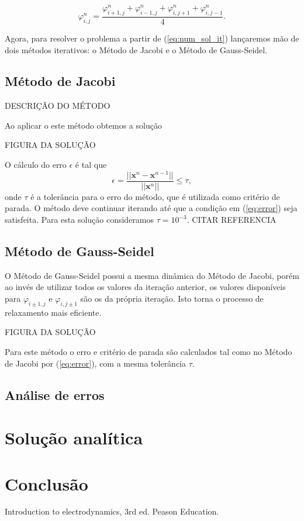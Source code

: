 \documentclass[a4paper,12pt]{article}
\begin{document}
\begin{equation}
  \varphi_{i,j}^n = \frac{\varphi_{i+1,j}^{n}+\varphi_{i-1,j}^{n}+\varphi_{i,j+1}^{n}+\varphi_{i,j-1}^{n}}{4}.
  \label{eq:num_sol_it}
\end{equation}

Agora, para resolver o problema a partir de (\ref{eq:num_sol_it}) lançaremos mão de dois métodos iterativos: o Método de Jacobi e o Método de Gauss-Seidel.

\subsection*{Método de Jacobi}

DESCRIÇÃO DO MÉTODO

Ao aplicar o este método obtemos a solução

FIGURA DA SOLUÇÃO

O cálculo do erro $\epsilon$ é tal que
\begin{equation}
  \epsilon = \frac{||\mathbf{x}^n-\mathbf{x}^{n-1}||}{||\mathbf{x}^n||} \leq \tau,
  \label{eq:error}
\end{equation}
onde $\tau$ é a tolerância para o erro do método, que é utilizada como critério de parada. O método deve continuar iterando até que a condição em (\ref{eq:error}) seja satisfeita. Para esta solução consideramos $\tau = 10^{-3}$. CITAR REFERENCIA


\subsection*{Método de Gauss-Seidel}

O Método de Gauss-Seidel possui a mesma dinâmica do Método de Jacobi, porém ao invés de utilizar todos os valores da
iteração anterior, os valores disponíveis para $\varphi_{i\pm1, j}$ e $\varphi_{i,j\pm 1}$ são os da própria iteração. Isto torna o processo de relaxamento mais eficiente.

FIGURA DA SOLUÇÃO

Para este método o erro e critério de parada são calculados tal como no Método de Jacobi por (\ref{eq:error}), com a mesma tolerância $\tau$.
\subsection*{Análise de erros}

\section{Solução analítica}

\section{Conclusão}

\begin{thebibliography}{99}

Introduction to electrodynamics, 3rd ed.
\newblock Peason Education.

\end{thebibliography}
\end{document}
